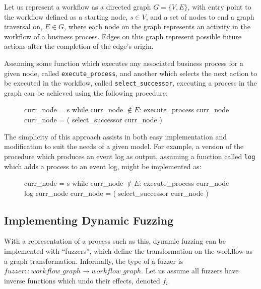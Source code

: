 \documentclass[draft,12pt]{llncs}  %
\begin{document}
Let us represent a workflow as a directed graph $G=\{V, E\}$, with entry point
to the workflow defined as a starting node, $s \in{} V$, and a set of nodes to end
a graph traversal on, $E \in G$, where each node on the graph
represents an activity in the workflow of a business process. Edges on this
graph represent possible future actions after the completion of the edge's origin.
\par

Assuming some function which executes any associated business process for a
given node, called \texttt{execute\_process}, and another which selects the next
action to be executed in the workflow, called \texttt{select\_successor}, executing
a process in the graph can be achieved using the following procedure:
\par

\begin{figure}[H]
  \begin{algorithm}
    curr_node = s
    while curr_node $\notin{} E$:
        execute_process curr_node
        curr_node = ( select_successor curr_node )
  \end{algorithm}
\end{figure}

The simplicity of this approach assists in both easy implementation and
modification to suit the needs of a given model. For example, a version of the
procedure which produces an event log as output, assuming a function called
\texttt{log} which adds a process to an event log, might be implemented as:

\begin{figure}[H]
  \begin{algorithm}
    curr_node = s
    while curr_node $\notin{} E$:
        execute_process curr_node
        log curr_node
        curr_node = ( select_successor curr_node )
  \end{algorithm}
\end{figure}
\subsection{Implementing Dynamic Fuzzing}
\label{subsec:example_implementation_details}
With a representation of a process such as this, dynamic fuzzing can be
implemented with ``fuzzers'', which define the transformation on the workflow
as a graph transformation. Informally, the type of a fuzzer is $fuzzer ::
workflow\_graph \rightarrow workflow\_graph$. Let us assume all fuzzers have inverse
functions which undo their effects, denoted $f_i$.
\par
\end{document}
